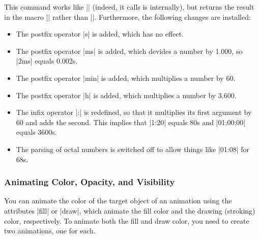 \begin{command}{\pgfparsetime{}}
  This command works like |\pgfmathparse| (indeed, it calls is
  internally), but returns the result in the macro |\pgftimeresult|
  rather than |\pgfmathresult|. Furthermore, the following changes are
  installed:

  \begin{itemize}
  \item 
    The postfix operator |s| is added, which has no effect.
  \item The postfix operator |ms| is added, which devides a number by
    1.000, so |2ms| equals 0.002s.
  \item
    The postfix operator |min| is added, which multiplies a number by
    60.
  \item The postfix operator |h| is added, which multiplies a number by
    3.600.
  \item The infix operator |:| is redefined, so that it multiplies its
    first argument by 60 and adds the second. This implies that
    |1:20| equals 80s and |01:00:00| equals 3600s.
  \item The parsing of octal numbers is switched off to allow things
    like |01:08| for 68s.
  \end{itemize}
\end{command}



\subsubsection{Animating Color, Opacity, and Visibility}
\label{section-base-animation-painting}

You can animate the color of the target object of an animation using
the attributes |fill| or |draw|, which animate the fill color and the
drawing (stroking) color, respectively. To animate both the fill and
draw color, you need to create two animations, one for each.

\begin{codeexample}[width=2.3cm]
\end{codeexample}

\begin{codeexample}[width=2.3cm]
\end{codeexample}

